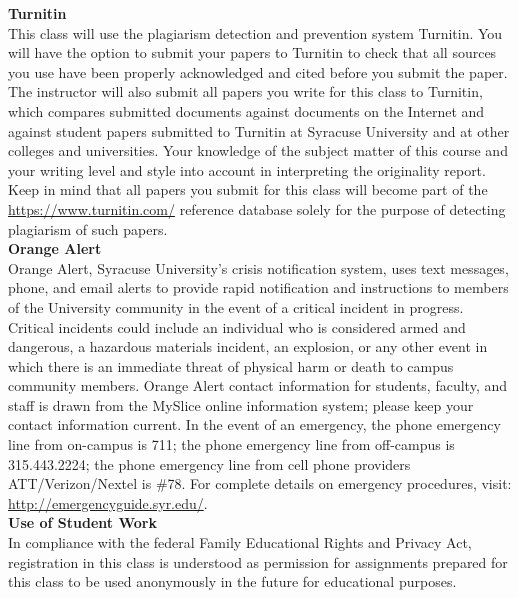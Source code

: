 \documentclass[11pt,letterpaper]{article}
\newcommand{\lefthead}[2]{\noindent\textbf{#1}\hfill\\[#2]}
\begin{document}
\lefthead{Turnitin}{0.3cm}
\noindent This class will use the plagiarism detection and prevention system Turnitin. You will have the option to submit your papers to Turnitin to check that all sources you use have been properly acknowledged and cited before you submit the paper. The instructor will also submit all papers you write for this class to Turnitin, which compares submitted documents against documents on the Internet and against student papers submitted to Turnitin at Syracuse University and at other colleges and universities. Your knowledge of the subject matter of this course and your writing level and style into account in interpreting the originality report. Keep in mind that all papers you submit for this class will become part of the \url{https://www.turnitin.com/} reference database solely for the purpose of detecting plagiarism of such papers. \\[0.3cm]





\lefthead{Orange Alert}{0.3cm}
\noindent Orange Alert, Syracuse University's crisis notification system, uses text messages, phone, and email alerts to provide rapid notification and instructions to members of the University community in the event of a critical incident in progress. Critical incidents could include an individual who is considered armed and dangerous, a hazardous materials incident, an explosion, or any other event in which there is an immediate threat of physical harm or death to campus community members. Orange Alert contact information for students, faculty, and staff is drawn from the MySlice online information system; please keep your contact information current. In the event of an emergency, the phone emergency line from on-campus is 711; the phone emergency line from off-campus is 315.443.2224; the phone emergency line from cell phone providers ATT/Verizon/Nextel is \#78. For complete details on emergency procedures, visit: \url{http://emergencyguide.syr.edu/}. \\[0.3cm]





\lefthead{Use of Student Work}{0.3cm}
\noindent In compliance with the federal Family Educational Rights and Privacy Act, registration in this class is understood as permission for assignments prepared for this class to be used anonymously in the future for educational purposes. \\[0.3cm]
\end{document}
